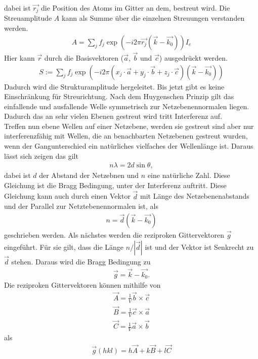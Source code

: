 dabei ist $\vec{r_j}$ die Position des Atoms im Gitter an dem, bestreut wird. Die Streuamplitude $A$ kann als Summe über die einzelnen Streuungen verstanden werden.
\begin{align}
	A = \sum_j f_j \exp(-i2\pi\vec{r_j}\left(\vec{k}-\vec{k_0}\right))I_e
\end{align}
Hier kann $\vec{r}$ durch die Basisvektoren ($\vec{a}$, $\vec{b}$ und $\vec{c}$) ausgedrückt werden.
\begin{align}
	S:= \sum_j f_j \exp(-i2\pi\left(x_j\cdot\vec{a}+y_j\cdot\vec{b}+z_j\cdot\vec{c}\right)\left(\vec{k}-\vec{k_0}\right))
\end{align}
Dadurch wird die Strukturamplitude hergeleitet. Bis jetzt gibt es keine Einschränkung für Streurichtung. Nach dem Huygenschen Prinzip gilt das einfallende und ausfallende Welle symmetrisch zur Netzebenennormalen liegen. Dadurch das an sehr vielen Ebenen gestreut wird tritt Interferenz auf.\\
Treffen nun ebene Wellen auf einer Netzebene, werden sie gestreut sind aber nur interferenzfähig mit Wellen, die an benachbarten Netzebenen gestreut wurden, wenn der Gangunterschied ein natürliches vielfaches der Wellenlänge ist. Daraus lässt sich zeigen das gilt
\begin{align}
	n\lambda = 2d\sin\theta,\label{eq:bragg}
\end{align}
dabei ist $d$ der Abstand der Netzebnen und $n$ eine natürliche Zahl. Diese Gleichung ist die Bragg Bedingung, unter der Interferenz auftritt. Diese Gleichung kann auch durch einen Vektor $\vec{d}$ mit Länge des Netzebenenabstands und der Parallel zur Netztebenennormalen ist, als
\begin{align}
	n=\vec{d}\left(\vec{k}-\vec{k_0}\right)
\end{align}
geschrieben werden. Als nächstes werden die reziproken Gittervektoren $\vec{g}$ eingeführt.
Für sie gilt, dass die Länge $n/|\vec{d}|$ ist und der Vektor ist Senkrecht zu $\vec{d}$ stehen. Daraus wird die Bragg Bedingung zu 
\begin{align}
	\vec{g}=\vec{k}-\vec{k_0}.
\end{align}
Die reziproken Gittervektoren können mithilfe von 
\begin{align*}
	\vec{A}=\frac{1}{V}\vec{b}\times\vec{c}\\
	\vec{B}=\frac{1}{V}\vec{c}\times\vec{a}\\
	\vec{C}=\frac{1}{V}\vec{a}\times\vec{b}
\end{align*}
als
\begin{align}
	\vec{g}(hkl)=h\vec{A}+k\vec{B}+l\vec{C}
\end{align}
